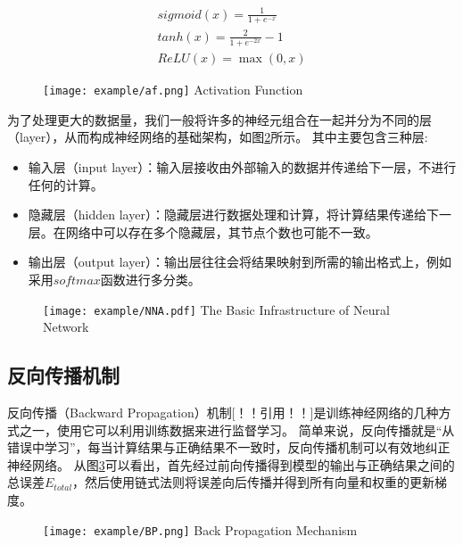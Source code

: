 \begin{gather}
  \label{enl2sql:afeq}
  sigmoid(x) = \frac{1}{1 + e^{-x}}\\
  tanh(x) = \frac{2}{1 + e^{-2x}} - 1\\
  ReLU(x) = \max(0,x)
\end{gather}

\begin{figure}[!htp]
  \centering
  \texttt{[image: example/af.png]}
    {Activation Function}
  \label{fig:af}
\end{figure}

为了处理更大的数据量，我们一般将许多的神经元组合在一起并分为不同的层（layer），从而构成神经网络的基础架构，如图\ref{fig:NNA}所示。
其中主要包含三种层:

\begin{itemize}
  \item 输入层（input layer）：输入层接收由外部输入的数据并传递给下一层，不进行任何的计算。
  \item 隐藏层（hidden layer）：隐藏层进行数据处理和计算，将计算结果传递给下一层。在网络中可以存在多个隐藏层，其节点个数也可能不一致。
  \item 输出层（output layer）：输出层往往会将结果映射到所需的输出格式上，例如采用$softmax$函数进行多分类。
\end{itemize}

\begin{figure}[!htp]
  \centering
  \texttt{[image: example/NNA.pdf]}
    {The Basic Infrastructure of Neural Network}
  \label{fig:NNA}
\end{figure}

\subsection{反向传播机制}

反向传播（Backward Propagation）机制[！！引用！！]是训练神经网络的几种方式之一，使用它可以利用训练数据来进行监督学习。
简单来说，反向传播就是“从错误中学习”，每当计算结果与正确结果不一致时，反向传播机制可以有效地纠正神经网络。
从图\ref{fig:BP}可以看出，首先经过前向传播得到模型的输出与正确结果之间的总误差$E_{total}$，然后使用链式法则将误差向后传播并得到所有向量和权重的更新梯度。

\begin{figure}[!htp]
  \centering
  \texttt{[image: example/BP.png]}
    {Back Propagation Mechanism}
  \label{fig:BP}
\end{figure}

